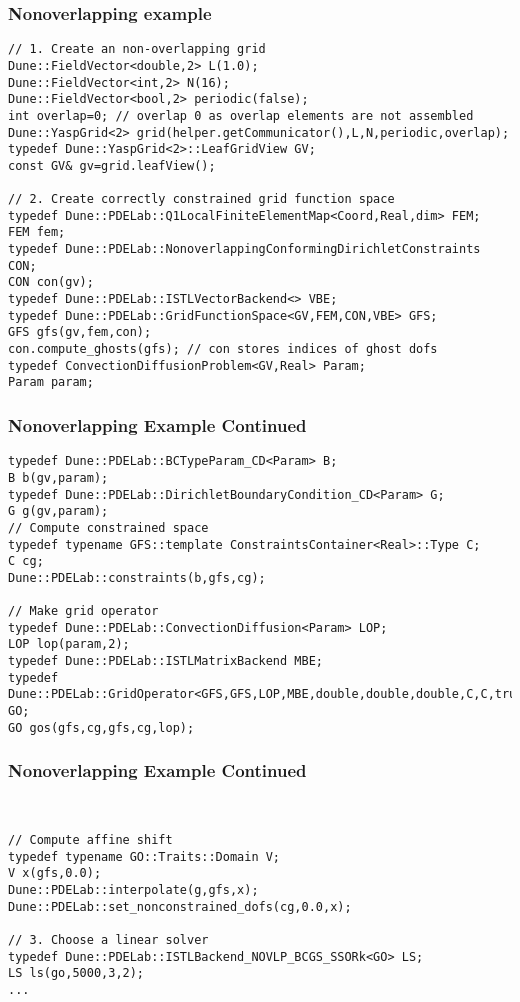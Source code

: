 \begin{frame}[fragile]
  \frametitle{Nonoverlapping example}
  \begin{lstlisting}
// 1. Create an non-overlapping grid
Dune::FieldVector<double,2> L(1.0);
Dune::FieldVector<int,2> N(16);
Dune::FieldVector<bool,2> periodic(false);
int overlap=0; // overlap 0 as overlap elements are not assembled
Dune::YaspGrid<2> grid(helper.getCommunicator(),L,N,periodic,overlap);
typedef Dune::YaspGrid<2>::LeafGridView GV;
const GV& gv=grid.leafView();

// 2. Create correctly constrained grid function space
typedef Dune::PDELab::Q1LocalFiniteElementMap<Coord,Real,dim> FEM;
FEM fem;
typedef Dune::PDELab::NonoverlappingConformingDirichletConstraints CON;
CON con(gv);
typedef Dune::PDELab::ISTLVectorBackend<> VBE;
typedef Dune::PDELab::GridFunctionSpace<GV,FEM,CON,VBE> GFS;
GFS gfs(gv,fem,con);
con.compute_ghosts(gfs); // con stores indices of ghost dofs
typedef ConvectionDiffusionProblem<GV,Real> Param;
Param param;
\end{lstlisting}
\end{frame}
\begin{frame}[fragile]
\frametitle<presentation>{Nonoverlapping Example Continued}
  \begin{lstlisting}
typedef Dune::PDELab::BCTypeParam_CD<Param> B;
B b(gv,param);
typedef Dune::PDELab::DirichletBoundaryCondition_CD<Param> G;
G g(gv,param);
// Compute constrained space
typedef typename GFS::template ConstraintsContainer<Real>::Type C;
C cg;
Dune::PDELab::constraints(b,gfs,cg);

// Make grid operator
typedef Dune::PDELab::ConvectionDiffusion<Param> LOP;
LOP lop(param,2);
typedef Dune::PDELab::ISTLMatrixBackend MBE;
typedef Dune::PDELab::GridOperator<GFS,GFS,LOP,MBE,double,double,double,C,C,true> GO;
GO gos(gfs,cg,gfs,cg,lop);

\end{lstlisting}
\end{frame}
\begin{frame}[fragile]
\frametitle<presentation>{Nonoverlapping Example Continued}
  \begin{lstlisting}


// Compute affine shift
typedef typename GO::Traits::Domain V;
V x(gfs,0.0);
Dune::PDELab::interpolate(g,gfs,x);
Dune::PDELab::set_nonconstrained_dofs(cg,0.0,x);

// 3. Choose a linear solver
typedef Dune::PDELab::ISTLBackend_NOVLP_BCGS_SSORk<GO> LS;
LS ls(go,5000,3,2);
...
\end{lstlisting}

\end{frame}

